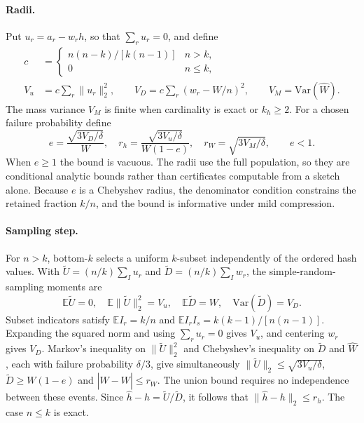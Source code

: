 \documentclass{article}
\begin{document}
\paragraph{Radii.}
Put $u_r=a_r-w_rh$, so that $\sum_ru_r=0$, and define
\begin{align}
c&=\begin{cases}n(n-k)/[k(n-1)]&n>k,\\0&n\le k,\end{cases}\nonumber\\
V_u&=c\sum_r\|u_r\|_2^2,\qquad
V_D=c\sum_r(w_r-W/n)^2,\qquad V_M=\mathrm{Var}(\hat W).
\label{eq:categorical-moments}
\end{align}
The mass variance $V_M$ is finite when cardinality is exact or $k_h\ge2$. For a
chosen failure probability define
\begin{equation}
e=\frac{\sqrt{3V_D/\delta}}{W},\quad
r_h=\frac{\sqrt{3V_u/\delta}}{W(1-e)},\quad
r_W=\sqrt{3V_M/\delta},\qquad e<1.
\label{eq:categorical-radii}
\end{equation}
When $e\ge1$ the bound is vacuous. The radii use the full population, so they
are conditional analytic bounds rather than certificates computable from a
sketch alone. Because $e$ is a Chebyshev radius, the denominator condition
constrains the retained fraction $k/n$, and the bound is informative under mild
compression.

\paragraph{Sampling step.}
For $n>k$, bottom-$k$ selects a uniform $k$-subset independently of the ordered
hash values. With $\tilde U=(n/k)\sum_Iu_r$ and $\tilde D=(n/k)\sum_Iw_r$, the
simple-random-sampling moments are
\[
\mathbb E\tilde U=0,\quad \mathbb E\|\tilde U\|_2^2=V_u,\quad
\mathbb E\tilde D=W,\quad \mathrm{Var}(\tilde D)=V_D.
\]
Subset indicators satisfy $\mathbb EI_r=k/n$ and
$\mathbb EI_rI_s=k(k-1)/[n(n-1)]$. Expanding the squared norm and using
$\sum_ru_r=0$ gives $V_u$, and centering $w_r$ gives $V_D$. Markov's inequality
on $\|\tilde U\|_2^2$ and Chebyshev's inequality on $\tilde D$ and $\hat W$,
each with failure probability $\delta/3$, give simultaneously
$\|\tilde U\|_2\le\sqrt{3V_u/\delta}$, $\tilde D\ge W(1-e)$ and
$|\hat W-W|\le r_W$. The union bound requires no independence between these
events. Since $\hat h-h=\tilde U/\tilde D$, it follows that
$\|\hat h-h\|_2\le r_h$. The case $n\le k$ is exact.
\end{document}
